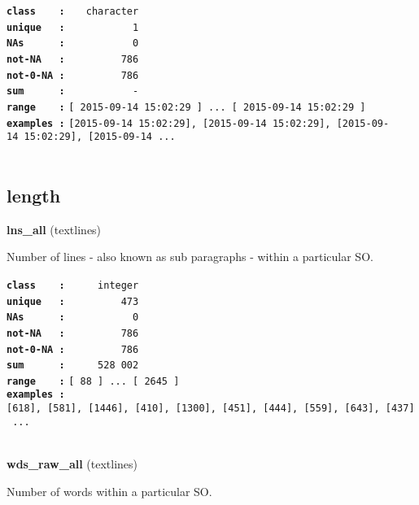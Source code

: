 \documentclass[]{article}
\begin{document}
\textbf{\texttt{class\ \ \ \ :}} \texttt{~~~character}\\
\textbf{\texttt{unique\ \ \ :}} \texttt{~~~~~~~~~~~1}\\
\textbf{\texttt{NAs\ \ \ \ \ \ :}} \texttt{~~~~~~~~~~~0}\\
\textbf{\texttt{not-NA\ \ \ :}} \texttt{~~~~~~~~~786}\\
\textbf{\texttt{not-0-NA\ :}} \texttt{~~~~~~~~~786}\\
\textbf{\texttt{sum\ \ \ \ \ \ :}} \texttt{~~~~~~~~~~~-}\\
\textbf{\texttt{range\ \ \ \ :}}
\texttt{{[}\ 2015-09-14\ 15:02:29\ {]}\ ...\ {[}\ 2015-09-14\ 15:02:29\ {]}}\\
\textbf{\texttt{examples\ :}}
\texttt{{[}2015-09-14\ 15:02:29{]},\ {[}2015-09-14\ 15:02:29{]},\ {[}2015-09-14\ 15:02:29{]},\ {[}2015-09-14\ ...}\\

~

\subsection{length}\label{length}

\textbf{lns\_all} (textlines)

Number of lines - also known as sub paragraphs - within a particular SO.

\textbf{\texttt{class\ \ \ \ :}} \texttt{~~~~~integer}\\
\textbf{\texttt{unique\ \ \ :}} \texttt{~~~~~~~~~473}\\
\textbf{\texttt{NAs\ \ \ \ \ \ :}} \texttt{~~~~~~~~~~~0}\\
\textbf{\texttt{not-NA\ \ \ :}} \texttt{~~~~~~~~~786}\\
\textbf{\texttt{not-0-NA\ :}} \texttt{~~~~~~~~~786}\\
\textbf{\texttt{sum\ \ \ \ \ \ :}} \texttt{~~~~~528~002}\\
\textbf{\texttt{range\ \ \ \ :}}
\texttt{{[}\ 88\ {]}\ ...\ {[}\ 2645\ {]}}\\
\textbf{\texttt{examples\ :}}
\texttt{{[}618{]},\ {[}581{]},\ {[}1446{]},\ {[}410{]},\ {[}1300{]},\ {[}451{]},\ {[}444{]},\ {[}559{]},\ {[}643{]},\ {[}437{]}\ ...}\\

~

\textbf{wds\_raw\_all} (textlines)

Number of words within a particular SO.
\end{document}
